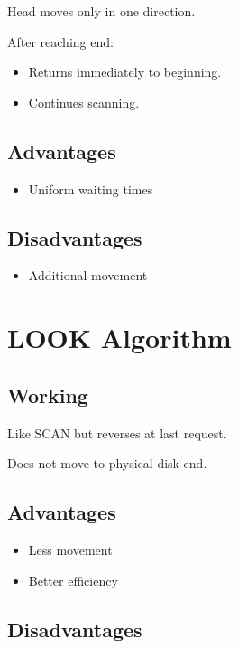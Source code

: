 Head moves only in one direction.

After reaching end:

\begin{itemize}
\item Returns immediately to beginning.
\item Continues scanning.
\end{itemize}

\subsection{Advantages}

\begin{itemize}
\item Uniform waiting times
\end{itemize}

\subsection{Disadvantages}

\begin{itemize}
\item Additional movement
\end{itemize}

\section{LOOK Algorithm}

\subsection{Working}

Like SCAN but reverses at last request.

Does not move to physical disk end.

\subsection{Advantages}

\begin{itemize}
\item Less movement
\item Better efficiency
\end{itemize}

\subsection{Disadvantages}

